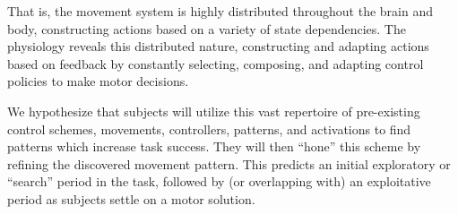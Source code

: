 \documentclass[../main.tex]{subfiles}
\begin{document}
That is, the movement system is highly distributed throughout the brain and body, constructing actions based on a variety of state dependencies\cite{sejnowskiPerspectivesCognitiveNeuroscience1988}. The physiology reveals this distributed nature, constructing and adapting actions based on feedback by constantly selecting, composing, and adapting control policies to make motor decisions.

We hypothesize that subjects will utilize this vast repertoire of pre-existing control schemes, movements, controllers, patterns, and activations to find patterns which increase task success. They will then ``hone'' this scheme by refining the discovered movement pattern. This predicts an initial exploratory or ``search'' period in the task, followed by (or overlapping with) an exploitative period as subjects settle on a motor solution.





\cleardoublepage\printendnotes%
\ifSubfilesClassLoaded{%
    \newpage%
}{}%
\end{document}
